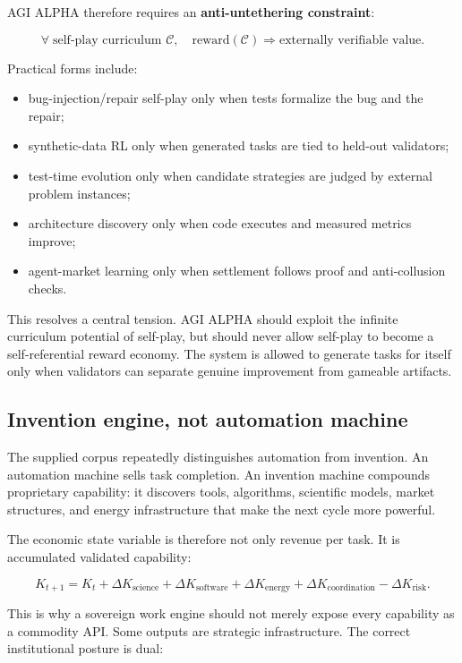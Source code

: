 \documentclass[
  11pt,
]{article}
\providecommand{\tightlist}{%
  \setlength{\itemsep}{0pt}\setlength{\parskip}{0pt}}
\begin{document}
AGI ALPHA therefore requires an \textbf{anti-untethering constraint}:

\[
\forall \; \text{self-play curriculum } \mathcal{C},
\quad
\text{reward}(\mathcal{C})
\Rightarrow
\text{externally verifiable value}.
\]

Practical forms include:

\begin{itemize}
\tightlist
\item
  bug-injection/repair self-play only when tests formalize the bug and
  the repair;
\item
  synthetic-data RL only when generated tasks are tied to held-out
  validators;
\item
  test-time evolution only when candidate strategies are judged by
  external problem instances;
\item
  architecture discovery only when code executes and measured metrics
  improve;
\item
  agent-market learning only when settlement follows proof and
  anti-collusion checks.
\end{itemize}

This resolves a central tension. AGI ALPHA should exploit the infinite
curriculum potential of self-play, but should never allow self-play to
become a self-referential reward economy. The system is allowed to
generate tasks for itself only when validators can separate genuine
improvement from gameable artifacts.

\subsection{Invention engine, not automation
machine}\label{invention-engine-not-automation-machine}

The supplied corpus repeatedly distinguishes automation from invention.
An automation machine sells task completion. An invention machine
compounds proprietary capability: it discovers tools, algorithms,
scientific models, market structures, and energy infrastructure that
make the next cycle more powerful.

The economic state variable is therefore not only revenue per task. It
is accumulated validated capability:

\[
K_{t+1}
=
K_t
+
\Delta K_{\text{science}}
+
\Delta K_{\text{software}}
+
\Delta K_{\text{energy}}
+
\Delta K_{\text{coordination}}
-
\Delta K_{\text{risk}}.
\]

This is why a sovereign work engine should not merely expose every
capability as a commodity API. Some outputs are strategic
infrastructure. The correct institutional posture is dual:
\end{document}
